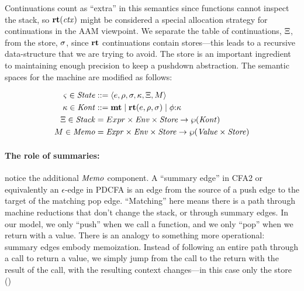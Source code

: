 Continuations count as ``extra'' in this semantics since functions cannot inspect the stack, so $\mathbf{rt}(\mathit{ctx})$ might be considered a special allocation strategy for continuations in the AAM viewpoint.
%
We separate the table of continuations, $\Xi$, from the store, $\sigma$, since $\mathbf{rt}$ continuations contain stores---this leads to a recursive data-structure that we are trying to avoid.
%
The store is an important ingredient to maintaining enough precision to keep a pushdown abstraction.
%
The semantic spaces for the machine are modified as follows:

\begin{align*}
  \varsigma \in \mathit{State} &::= \langle e,\rho,\sigma,\kappa,\Xi,M \rangle \\
  \kappa \in \mathit{Kont} &::= \mathbf{mt} \mathrel{\mid} \mathbf{rt}(e,\rho,\sigma) \mathrel{\mid} \phi{\tt :} \kappa \\
  \Xi \in \mathit{Stack} &= Expr \times \mathit{Env}\times \mathit{Store} \to \wp(\mathit{Kont}) \\
  M \in \mathit{Memo} &= \mathit{Expr} \times \mathit{Env}\times \mathit{Store} \to \wp(\mathit{Value} \times \mathit{Store})
\end{align*}

\paragraph{The role of summaries:} notice the additional $\mathit{Memo}$ component.
%
A ``summary edge'' in CFA2 or equivalently an $\epsilon$-edge in PDCFA is an edge from the source of a push edge to the target of the matching pop edge.
%
``Matching'' here means there is a path through machine reductions that don't change the stack, or through summary edges.
%
In our model, we only ``push'' when we call a function, and we only ``pop'' when we return with a value.
%
There is an analogy to something more operational: summary edges embody memoization.
%
Instead of following an entire path through a call to return a value, we simply jump from the call to the return with the result of the call, with the resulting context changes---in this case only the store ()

